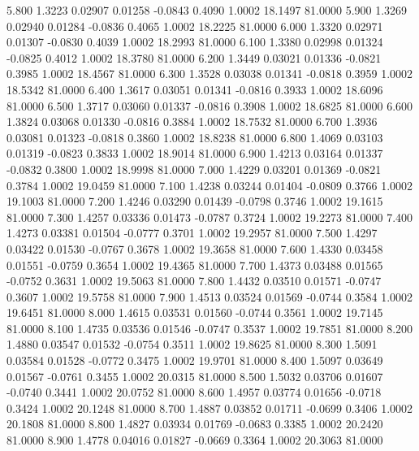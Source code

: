    5.800   1.3223   0.02907   0.01258  -0.0843   0.4090   1.0002  18.1497  81.0000
   5.900   1.3269   0.02940   0.01284  -0.0836   0.4065   1.0002  18.2225  81.0000
   6.000   1.3320   0.02971   0.01307  -0.0830   0.4039   1.0002  18.2993  81.0000
   6.100   1.3380   0.02998   0.01324  -0.0825   0.4012   1.0002  18.3780  81.0000
   6.200   1.3449   0.03021   0.01336  -0.0821   0.3985   1.0002  18.4567  81.0000
   6.300   1.3528   0.03038   0.01341  -0.0818   0.3959   1.0002  18.5342  81.0000
   6.400   1.3617   0.03051   0.01341  -0.0816   0.3933   1.0002  18.6096  81.0000
   6.500   1.3717   0.03060   0.01337  -0.0816   0.3908   1.0002  18.6825  81.0000
   6.600   1.3824   0.03068   0.01330  -0.0816   0.3884   1.0002  18.7532  81.0000
   6.700   1.3936   0.03081   0.01323  -0.0818   0.3860   1.0002  18.8238  81.0000
   6.800   1.4069   0.03103   0.01319  -0.0823   0.3833   1.0002  18.9014  81.0000
   6.900   1.4213   0.03164   0.01337  -0.0832   0.3800   1.0002  18.9998  81.0000
   7.000   1.4229   0.03201   0.01369  -0.0821   0.3784   1.0002  19.0459  81.0000
   7.100   1.4238   0.03244   0.01404  -0.0809   0.3766   1.0002  19.1003  81.0000
   7.200   1.4246   0.03290   0.01439  -0.0798   0.3746   1.0002  19.1615  81.0000
   7.300   1.4257   0.03336   0.01473  -0.0787   0.3724   1.0002  19.2273  81.0000
   7.400   1.4273   0.03381   0.01504  -0.0777   0.3701   1.0002  19.2957  81.0000
   7.500   1.4297   0.03422   0.01530  -0.0767   0.3678   1.0002  19.3658  81.0000
   7.600   1.4330   0.03458   0.01551  -0.0759   0.3654   1.0002  19.4365  81.0000
   7.700   1.4373   0.03488   0.01565  -0.0752   0.3631   1.0002  19.5063  81.0000
   7.800   1.4432   0.03510   0.01571  -0.0747   0.3607   1.0002  19.5758  81.0000
   7.900   1.4513   0.03524   0.01569  -0.0744   0.3584   1.0002  19.6451  81.0000
   8.000   1.4615   0.03531   0.01560  -0.0744   0.3561   1.0002  19.7145  81.0000
   8.100   1.4735   0.03536   0.01546  -0.0747   0.3537   1.0002  19.7851  81.0000
   8.200   1.4880   0.03547   0.01532  -0.0754   0.3511   1.0002  19.8625  81.0000
   8.300   1.5091   0.03584   0.01528  -0.0772   0.3475   1.0002  19.9701  81.0000
   8.400   1.5097   0.03649   0.01567  -0.0761   0.3455   1.0002  20.0315  81.0000
   8.500   1.5032   0.03706   0.01607  -0.0740   0.3441   1.0002  20.0752  81.0000
   8.600   1.4957   0.03774   0.01656  -0.0718   0.3424   1.0002  20.1248  81.0000
   8.700   1.4887   0.03852   0.01711  -0.0699   0.3406   1.0002  20.1808  81.0000
   8.800   1.4827   0.03934   0.01769  -0.0683   0.3385   1.0002  20.2420  81.0000
   8.900   1.4778   0.04016   0.01827  -0.0669   0.3364   1.0002  20.3063  81.0000
